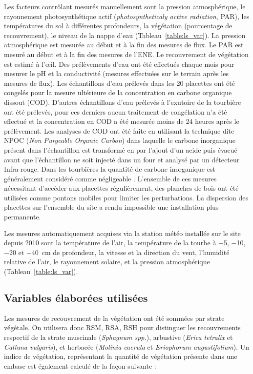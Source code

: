 Les facteurs contrôlant mesurés manuellement sont la pression atmosphérique, le rayonnement photosynthétique actif (\textit{photosyntheticaly active radiation}, PAR), les températures du sol à différentes profondeurs, la végétation (pourcentage de recouvrement), le niveau de la nappe d'eau (Tableau~\ref{table:ls_var}).
La pression atmosphérique est mesurée au début et à la fin des mesures de flux.
Le PAR est mesuré au début et à la fin des mesures de l'ENE.
Le recouvrement de végétation est estimé à l’œil.
Des prélèvements d'eau ont été effectués chaque mois pour mesurer le pH et la conductivité (mesures effectuées sur le terrain après les mesures de flux).
Les échantillons d'eau prélevés dans les 20 placettes ont été congelés pour la mesure ultérieure de la concentration en carbone organique dissout (COD).
D'autres échantillons d'eau prélevés à l'exutoire de la tourbière ont été prélevés, pour ces derniers aucun traitement de congélation n'a été effectué et la concentration en COD a été mesurée moins de 24 heures après le prélèvement.
Les analyses de COD ont été faite en utilisant la technique dite NPOC (\textit{Non Purgeable Organic Carbon}) dans laquelle le carbone inorganique présent dans l'échantillon est transformé en \coo par l'ajout d'un acide puis évacué avant que l'échantillon ne soit injecté dans un four et analysé par un détecteur Infra-rouge.
Dans les tourbières la quantité de carbone inorganique est généralement considéré comme négligeable \citep{worrall2009}.
L'ensemble de ces mesures nécessitant d'accéder aux placettes régulièrement, des planches de bois ont été utilisées comme pontons mobiles pour limiter les perturbations. La dispersion des placettes sur l'ensemble du site a rendu impossible une installation plus permanente.

Les mesures automatiquement acquises via la station météo installée sur le site depuis 2010 sont la température de l'air, la température de la tourbe à \num{-5}, \num{-10}, \num{-20} et \SI{-40}{\centi\metre} de profondeur, la vitesse et la direction du vent, l'humidité relative de l'air, le rayonnement solaire, et la pression atmosphérique (Tableau~\ref{table:ls_var}).

\subsection{Variables élaborées utilisées}

Les mesures de recouvrement de la végétation ont été sommées par strate végétale.
On utilisera donc RSM, RSA, RSH pour distinguer les recouvrements respectif de la strate muscinale (\textit{Sphagnum spp.}), arbustive (\textit{Erica tetralix} et \textit{Calluna vulgaris}), et herbacée (\textit{Molinia caerula} et \textit{Eriophorum augustifolium}).
Un indice de végétation, représentant la quantité de végétation présente dans une embase est également calculé de la façon suivante : 

